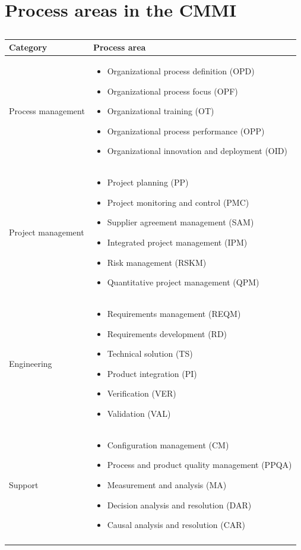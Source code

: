 \section{Process areas in the CMMI}
\begin{longtable}{ |p{3cm}|p{8cm}|  }
\hline
Category & Process area \\
\hline
\hline
Process management &
\begin{itemize}
\item Organizational process definition (OPD)
\item Organizational process focus (OPF)
\item Organizational training (OT)
\item Organizational process performance (OPP)
\item Organizational innovation and deployment (OID)
\end{itemize}\\
\hline
Project management &
\begin{itemize}
  \item Project planning (PP)
  \item Project monitoring and control (PMC)
  \item Supplier agreement management (SAM)
  \item Integrated project management (IPM)
  \item Risk management (RSKM)
  \item Quantitative project management (QPM)
\end{itemize}\\
\hline
Engineering &
\begin{itemize}
  \item Requirements management (REQM)
  \item Requirements development (RD)
  \item Technical solution (TS)
  \item Product integration (PI)
  \item Verification (VER)
  \item Validation (VAL)
\end{itemize}\\
\hline
Support &
\begin{itemize}
  \item Configuration management (CM)
  \item Process and product quality management (PPQA)
  \item Measurement and analysis (MA)
  \item Decision analysis and resolution (DAR)
  \item Causal analysis and resolution (CAR)
\end{itemize}\\
\hline
\caption{}
\label{table:T9_3}
\end{longtable}

